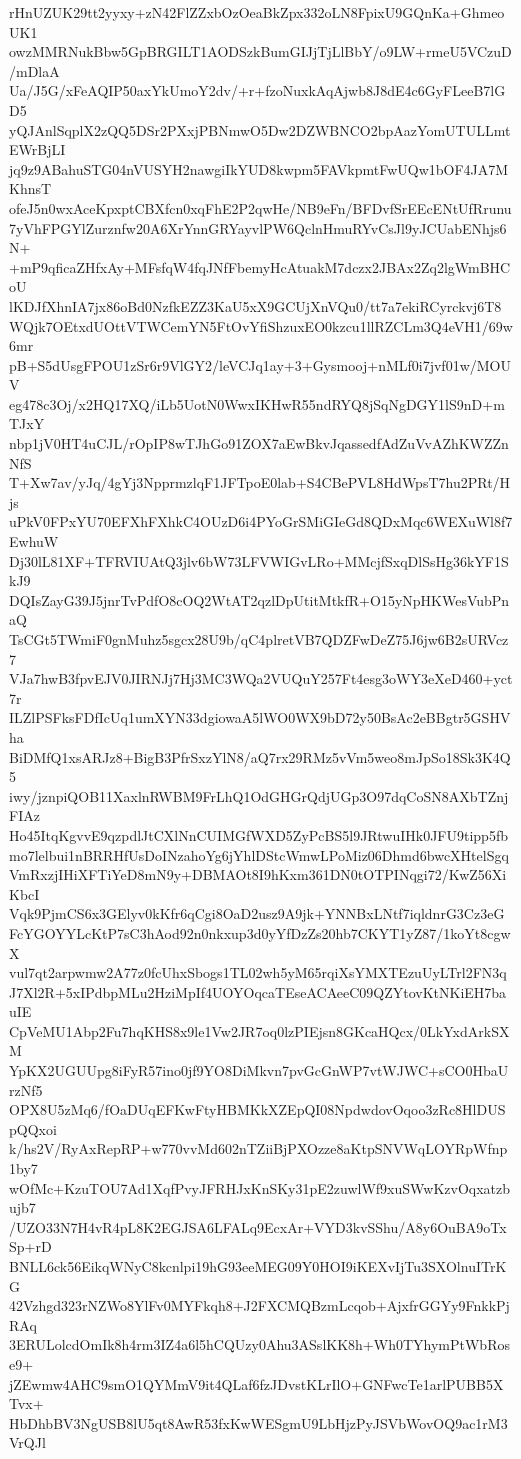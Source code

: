 rHnUZUK29tt2yyxy+zN42FlZZxbOzOeaBkZpx332oLN8FpixU9GQnKa+GhmeoUK1
owzMMRNukBbw5GpBRGILT1AODSzkBumGIJjTjLlBbY/o9LW+rmeU5VCzuD/mDlaA
Ua/J5G/xFeAQIP50axYkUmoY2dv/+r+fzoNuxkAqAjwb8J8dE4c6GyFLeeB7lGD5
yQJAnlSqplX2zQQ5DSr2PXxjPBNmwO5Dw2DZWBNCO2bpAazYomUTULLmtEWrBjLI
jq9z9ABahuSTG04nVUSYH2nawgiIkYUD8kwpm5FAVkpmtFwUQw1bOF4JA7MKhnsT
ofeJ5n0wxAceKpxptCBXfcn0xqFhE2P2qwHe/NB9eFn/BFDvfSrEEcENtUfRrunu
7yVhFPGYlZurznfw20A6XrYnnGRYayvlPW6QclnHmuRYvCsJl9yJCUabENhjs6N+
+mP9qficaZHfxAy+MFsfqW4fqJNfFbemyHcAtuakM7dczx2JBAx2Zq2lgWmBHCoU
lKDJfXhnIA7jx86oBd0NzfkEZZ3KaU5xX9GCUjXnVQu0/tt7a7ekiRCyrckvj6T8
WQjk7OEtxdUOttVTWCemYN5FtOvYfiShzuxEO0kzcu1llRZCLm3Q4eVH1/69w6mr
pB+S5dUsgFPOU1zSr6r9VlGY2/leVCJq1ay+3+Gysmooj+nMLf0i7jvf01w/MOUV
eg478c3Oj/x2HQ17XQ/iLb5UotN0WwxIKHwR55ndRYQ8jSqNgDGY1lS9nD+mTJxY
nbp1jV0HT4uCJL/rOpIP8wTJhGo91ZOX7aEwBkvJqassedfAdZuVvAZhKWZZnNfS
T+Xw7av/yJq/4gYj3NpprmzlqF1JFTpoE0lab+S4CBePVL8HdWpsT7hu2PRt/Hjs
uPkV0FPxYU70EFXhFXhkC4OUzD6i4PYoGrSMiGIeGd8QDxMqc6WEXuWl8f7EwhuW
Dj30lL81XF+TFRVIUAtQ3jlv6bW73LFVWIGvLRo+MMcjfSxqDlSsHg36kYF1SkJ9
DQIsZayG39J5jnrTvPdfO8cOQ2WtAT2qzlDpUtitMtkfR+O15yNpHKWesVubPnaQ
TsCGt5TWmiF0gnMuhz5sgcx28U9b/qC4plretVB7QDZFwDeZ75J6jw6B2sURVcz7
VJa7hwB3fpvEJV0JIRNJj7Hj3MC3WQa2VUQuY257Ft4esg3oWY3eXeD460+yct7r
ILZlPSFksFDfIcUq1umXYN33dgiowaA5lWO0WX9bD72y50BsAc2eBBgtr5GSHVha
BiDMfQ1xsARJz8+BigB3PfrSxzYlN8/aQ7rx29RMz5vVm5weo8mJpSo18Sk3K4Q5
iwy/jznpiQOB11XaxlnRWBM9FrLhQ1OdGHGrQdjUGp3O97dqCoSN8AXbTZnjFIAz
Ho45ItqKgvvE9qzpdlJtCXlNnCUIMGfWXD5ZyPcBS5l9JRtwuIHk0JFU9tipp5fb
mo7lelbui1nBRRHfUsDoINzahoYg6jYhlDStcWmwLPoMiz06Dhmd6bwcXHtelSgq
VmRxzjIHiXFTiYeD8mN9y+DBMAOt8I9hKxm361DN0tOTPINqgi72/KwZ56XiKbcI
Vqk9PjmCS6x3GElyv0kKfr6qCgi8OaD2usz9A9jk+YNNBxLNtf7iqldnrG3Cz3eG
FcYGOYYLcKtP7sC3hAod92n0nkxup3d0yYfDzZs20hb7CKYT1yZ87/1koYt8cgwX
vul7qt2arpwmw2A77z0fcUhxSbogs1TL02wh5yM65rqiXsYMXTEzuUyLTrl2FN3q
J7Xl2R+5xIPdbpMLu2HziMpIf4UOYOqcaTEseACAeeC09QZYtovKtNKiEH7bauIE
CpVeMU1Abp2Fu7hqKHS8x9le1Vw2JR7oq0lzPIEjsn8GKcaHQcx/0LkYxdArkSXM
YpKX2UGUUpg8iFyR57ino0jf9YO8DiMkvn7pvGcGnWP7vtWJWC+sCO0HbaUrzNf5
OPX8U5zMq6/fOaDUqEFKwFtyHBMKkXZEpQI08NpdwdovOqoo3zRc8HlDUSpQQxoi
k/hs2V/RyAxRepRP+w770vvMd602nTZiiBjPXOzze8aKtpSNVWqLOYRpWfnp1by7
wOfMc+KzuTOU7Ad1XqfPvyJFRHJxKnSKy31pE2zuwlWf9xuSWwKzvOqxatzbujb7
/UZO33N7H4vR4pL8K2EGJSA6LFALq9EcxAr+VYD3kvSShu/A8y6OuBA9oTxSp+rD
BNLL6ck56EikqWNyC8kcnlpi19hG93eeMEG09Y0HOI9iKEXvIjTu3SXOlnuITrKG
42Vzhgd323rNZWo8YlFv0MYFkqh8+J2FXCMQBzmLcqob+AjxfrGGYy9FnkkPjRAq
3ERULolcdOmIk8h4rm3IZ4a6l5hCQUzy0Ahu3ASslKK8h+Wh0TYhymPtWbRose9+
jZEwmw4AHC9smO1QYMmV9it4QLaf6fzJDvstKLrIlO+GNFwcTe1arlPUBB5XTvx+
HbDhbBV3NgUSB8lU5qt8AwR53fxKwWESgmU9LbHjzPyJSVbWovOQ9ac1rM3VrQJl
